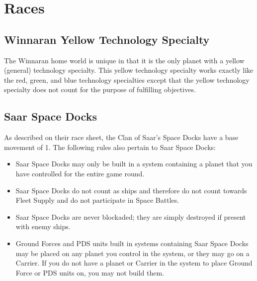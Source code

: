 \documentclass[11pt,fleqn]{book} %
\begin{document}
\section{Races}


\begin{SEbox}
\subsection{Winnaran Yellow Technology Specialty}
The Winnaran home world is unique in that it is the only planet with a yellow (general) technology specialty. 
This yellow technology specialty works exactly like the red, green, and blue technology specialties except that the yellow technology specialty does not count for the purpose of fulfilling objectives.

\subsection{Saar Space Docks}
As described on their race sheet, the Clan of Saar’s Space Docks have a base movement of 1. The following rules also pertain to Saar Space Docks:
\begin{itemize}
	\item Saar Space Docks may only be built in a system containing a planet that you have controlled for the entire game round.
	\item Saar Space Docks do not count as ships and therefore do not count towards Fleet Supply and do not participate in Space Battles.
	\item Saar Space Docks are never blockaded; they are simply destroyed if present with enemy ships.
	\item Ground Forces and PDS units built in systems containing Saar Space Docks may be placed on any planet you control in the system, or they may go on a Carrier. 
	If you do not have a planet or Carrier in the system to place Ground Force or PDS units on, you may not build them.
\end{itemize}
\end{SEbox}
\end{document}
